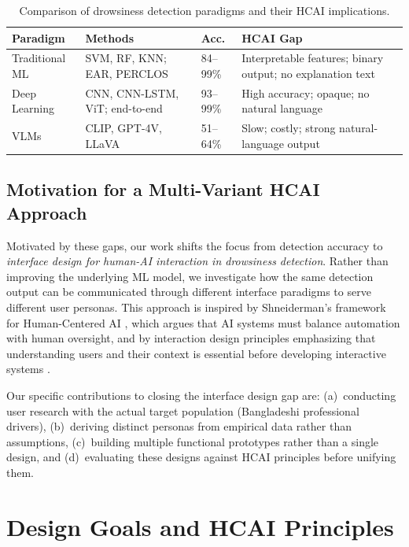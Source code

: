 \documentclass[sigconf]{acmart}
\begin{document}
\begin{table}[H]
\caption{Comparison of drowsiness detection paradigms and their HCAI implications.}
\label{tab:approaches}
\small
\setlength{\tabcolsep}{3pt}
\begin{tabular}{p{1.3cm}p{1.9cm}p{1.0cm}p{2.2cm}}
\toprule
\textbf{Paradigm} & \textbf{Methods} & \textbf{Acc.} & \textbf{HCAI Gap}\\
\midrule
Traditional ML & SVM, RF, KNN; EAR, PERCLOS & 84--99\% & Interpretable features; binary output; no explanation text\\[3pt]
Deep Learning & CNN, CNN-LSTM, ViT; end-to-end & 93--99\% & High accuracy; opaque; no natural language\\[3pt]
VLMs & CLIP, GPT-4V, LLaVA & 51--64\% & Slow; costly; strong natural-language output\\
\bottomrule
\end{tabular}
\end{table}

\subsection{Motivation for a Multi-Variant HCAI Approach}

Motivated by these gaps, our work shifts the focus from detection accuracy to \textit{interface design for human-AI interaction in drowsiness detection}. Rather than improving the underlying ML model, we investigate how the same detection output can be communicated through different interface paradigms to serve different user personas. This approach is inspired by Shneiderman's framework for Human-Centered AI \cite{ref14}, which argues that AI systems must balance automation with human oversight, and by interaction design principles emphasizing that understanding users and their context is essential before developing interactive systems \cite{ref12, ref13}.

Our specific contributions to closing the interface design gap are: (a)~conducting user research with the actual target population (Bangladeshi professional drivers), (b)~deriving distinct personas from empirical data rather than assumptions, (c)~building multiple functional prototypes rather than a single design, and (d)~evaluating these designs against HCAI principles before unifying them.

\section{Design Goals and HCAI Principles}
\end{document}
